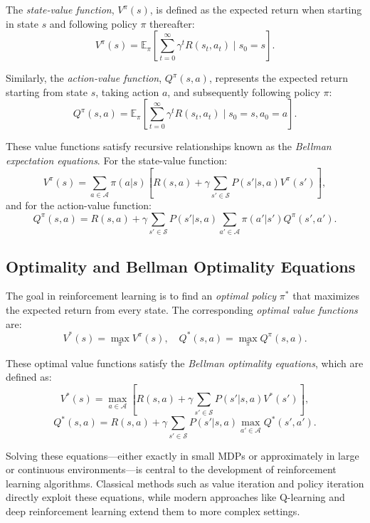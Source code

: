 The \textit{state-value function}, $V^\pi(s)$, is defined as the expected return when starting in state $s$ and following policy $\pi$ thereafter:
\[
V^\pi(s) = \mathbb{E}_\pi \left[ \sum_{t=0}^{\infty} \gamma^t R(s_t, a_t) \mid s_0 = s \right].
\]

Similarly, the \textit{action-value function}, $Q^\pi(s, a)$, represents the expected return starting from state $s$, taking action $a$, and subsequently following policy $\pi$:
\[
Q^\pi(s, a) = \mathbb{E}_\pi \left[ \sum_{t=0}^{\infty} \gamma^t R(s_t, a_t) \mid s_0 = s, a_0 = a \right].
\]

These value functions satisfy recursive relationships known as the \textit{Bellman expectation equations}. For the state-value function:
\[
V^\pi(s) = \sum_{a \in \mathcal{A}} \pi(a|s) \left[ R(s, a) + \gamma \sum_{s' \in \mathcal{S}} P(s'|s, a) V^\pi(s') \right],
\]
and for the action-value function:
\[
Q^\pi(s, a) = R(s, a) + \gamma \sum_{s' \in \mathcal{S}} P(s'|s, a) \sum_{a' \in \mathcal{A}} \pi(a'|s') Q^\pi(s', a').
\]

\subsection{Optimality and Bellman Optimality Equations}

The goal in reinforcement learning is to find an \textit{optimal policy} $\pi^*$ that maximizes the expected return from every state. The corresponding \textit{optimal value functions} are:
\[
V^*(s) = \max_\pi V^\pi(s), \quad Q^*(s, a) = \max_\pi Q^\pi(s, a).
\]

These optimal value functions satisfy the \textit{Bellman optimality equations}, which are defined as:
\[
V^*(s) = \max_{a \in \mathcal{A}} \left[ R(s, a) + \gamma \sum_{s' \in \mathcal{S}} P(s'|s, a) V^*(s') \right],
\]
\[
Q^*(s, a) = R(s, a) + \gamma \sum_{s' \in \mathcal{S}} P(s'|s, a) \max_{a' \in \mathcal{A}} Q^*(s', a').
\]

Solving these equations—either exactly in small MDPs or approximately in large or continuous environments—is central to the development of reinforcement learning algorithms. Classical methods such as value iteration and policy iteration directly exploit these equations, while modern approaches like Q-learning and deep reinforcement learning extend them to more complex settings.

